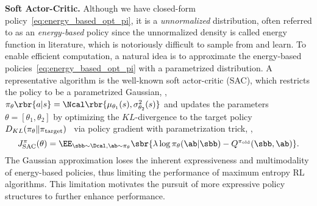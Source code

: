 \textbf{Soft Actor-Critic.} 
Although we have closed-form policy~\eqref{eq:energy_based_opt_pi}, it is a \emph{unnormalized} distribution, often referred to as an \emph{energy-based} policy since the unnormalized density is called energy function in literature, which is notoriously difficult to sample from and learn. To enable efficient computation, a natural idea is to approximate the energy-based policies~\eqref{eq:energy_based_opt_pi} with a parametrized distribution. 
A representative algorithm is the well-known soft actor-critic (SAC), which restricts the policy to be a parametrized Gaussian, \ie, $\pi_\theta\rbr{a|s} = \Ncal\rbr{ \mu_{\theta_1}(s), \sigma^2_{\theta_2}(s)}$ and updates the parameters $\theta = [\theta_1, \theta_2]$ by optimizing the $KL$-divergence to the target policy $D_{KL}(\pi_\theta\|\pi_{\rm target})$~\cite{haarnoja2018soft} via policy gradient with parametrization trick, \ie, %
$$
J^\pi_{\rm SAC}(\theta)=\EE_{\sbb\sim\Dcal,\ab\sim\pi_\theta}\sbr{\lambda\log\pi_\theta(\ab|\sbb)-Q^{\pi_{\rm old}}(\sbb,\ab)}. 
$$ 
The Gaussian approximation loses the inherent expressiveness and multimodality of energy-based policies, thus limiting the performance of maximum entropy RL algorithms. This limitation motivates the pursuit of more expressive policy structures to further enhance performance.



